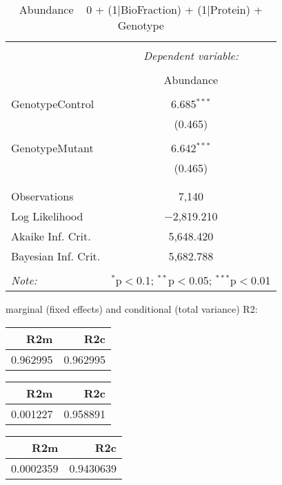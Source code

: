 \documentclass[11pt]{report}
\begin{document}
\begin{table}[!htbp] \centering 
  \caption{Abundance ~ 0 + (1|BioFraction) + (1|Protein) + Genotype} 
  \label{} 
\begin{tabular}{@{\extracolsep{5pt}}lc} 
\\[-1.8ex]\hline 
\hline \\[-1.8ex] 
 & \multicolumn{1}{c}{\textit{Dependent variable:}} \\ 
\cline{2-2} 
\\[-1.8ex] & Abundance \\ 
\hline \\[-1.8ex] 
 GenotypeControl & 6.685$^{***}$ \\ 
  & (0.465) \\ 
  & \\ 
 GenotypeMutant & 6.642$^{***}$ \\ 
  & (0.465) \\ 
  & \\ 
\hline \\[-1.8ex] 
Observations & 7,140 \\ 
Log Likelihood & $-$2,819.210 \\ 
Akaike Inf. Crit. & 5,648.420 \\ 
Bayesian Inf. Crit. & 5,682.788 \\ 
\hline 
\hline \\[-1.8ex] 
\textit{Note:}  & \multicolumn{1}{r}{$^{*}$p$<$0.1; $^{**}$p$<$0.05; $^{***}$p$<$0.01} \\ 
\end{tabular} 
\end{table} 
marginal (fixed effects) and conditional (total variance) R2:

\begin{tabular}{r|r}
\hline
R2m & R2c\\
\hline
0.962995 & 0.962995\\
\hline
\end{tabular}

\begin{tabular}{r|r}
\hline
R2m & R2c\\
\hline
0.001227 & 0.958891\\
\hline
\end{tabular}

\begin{tabular}{r|r}
\hline
R2m & R2c\\
\hline
0.0002359 & 0.9430639\\
\hline
\end{tabular}
\end{document}
